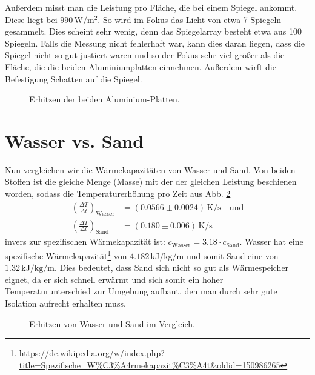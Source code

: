 \documentclass[12pt,a4paper,headinclude,bibtotoc]{scrartcl}
\begin{document}
Außerdem misst man die Leistung pro Fläche, die bei einem Spiegel ankommt.
Diese liegt bei $990\,\si{\watt\per\meter^2}$.
So wird im Fokus das Licht von etwa 7 Spiegeln gesammelt.
Dies scheint sehr wenig, denn das Spiegelarray besteht etwa aus 100 Spiegeln.
Falls die Messung nicht fehlerhaft war, kann dies daran liegen, dass die Spiegel nicht so gut justiert waren und so der Fokus sehr viel größer als die Fläche, die die beiden Aluminiumplatten einnehmen.
Außerdem wirft die Befestigung Schatten auf die Spiegel.
\begin{figure}[!htb]
	\centering
	\begin{minipage}{0.75\textwidth}	
		\resizebox{\textwidth}{!}{   		
   		}
		\caption{Erhitzen der beiden Aluminium-Platten.}
		\label{fig:aluSolar}
   \end{minipage}   
\end{figure}

\section{Wasser vs. Sand}
Nun vergleichen wir die Wärmekapazitäten von Wasser und Sand.
Von beiden Stoffen ist die gleiche Menge (Masse) mit der der gleichen Leistung beschienen worden, sodass die Temperaturerhöhung pro Zeit aus Abb. \ref{fig:wasserSandSolar}
\begin{align*}
	\left(\frac{\Delta T}{\Delta t}\right)_\text{Wasser} &= (0.0566 \pm 0.0024)\,\si{\kelvin\per\second}\quad\text{und}\\
	\left(\frac{\Delta T}{\Delta t}\right)_\text{Sand} &= (0.180 \pm 0.006)\,\si{\kelvin\per\second}
\end{align*}
invers zur spezifischen Wärmekapazität ist: $c_\text{Wasser}=3.18\cdot c_\text{Sand}$.
Wasser hat eine spezifische Wärmekapazität\footnote{\url{https://de.wikipedia.org/w/index.php?title=Spezifische\_W\%C3\%A4rmekapazit\%C3\%A4t&oldid=150986265}} von $4.182\,\si{\kilo\joule\per\kilo\gram\per\meter}$ und somit Sand eine von $1.32\,\si{\kilo\joule\per\kilo\gram\per\meter}$.
Dies bedeutet, dass Sand sich nicht so gut als Wärmespeicher eignet, da er sich schnell erwärmt und sich somit ein hoher Temperaturunterschied zur Umgebung aufbaut, den man durch sehr gute Isolation aufrecht erhalten muss.

\begin{figure}[!htb]
	\centering
	\begin{minipage}{0.75\textwidth}	
		\resizebox{\textwidth}{!}{   		
   		}
		\caption{Erhitzen von Wasser und Sand im Vergleich.}
		\label{fig:wasserSandSolar}
   \end{minipage}
\end{figure}
\end{document}
